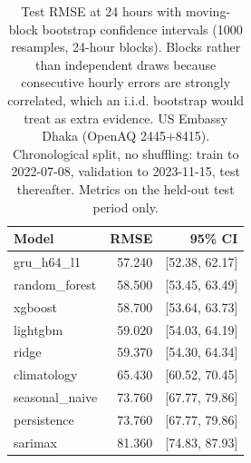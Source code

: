 \begin{table}[htbp]
\caption{Test RMSE at 24 hours with moving-block bootstrap confidence intervals (1000 resamples, 24-hour blocks). Blocks rather than independent draws because consecutive hourly errors are strongly correlated, which an i.i.d. bootstrap would treat as extra evidence. US Embassy Dhaka (OpenAQ 2445+8415). Chronological split, no shuffling: train to 2022-07-08, validation to 2023-11-15, test thereafter. Metrics on the held-out test period only.}
\label{tab:bootstrap_ci}
\begin{tabular}{lrr}
\toprule
Model & RMSE & 95\% CI \\
\midrule
gru\_h64\_l1 & 57.240 & [52.38, 62.17] \\
random\_forest & 58.500 & [53.45, 63.49] \\
xgboost & 58.700 & [53.64, 63.73] \\
lightgbm & 59.020 & [54.03, 64.19] \\
ridge & 59.370 & [54.30, 64.34] \\
climatology & 65.430 & [60.52, 70.45] \\
seasonal\_naive & 73.760 & [67.77, 79.86] \\
persistence & 73.760 & [67.77, 79.86] \\
sarimax & 81.360 & [74.83, 87.93] \\
\bottomrule
\end{tabular}
\end{table}
